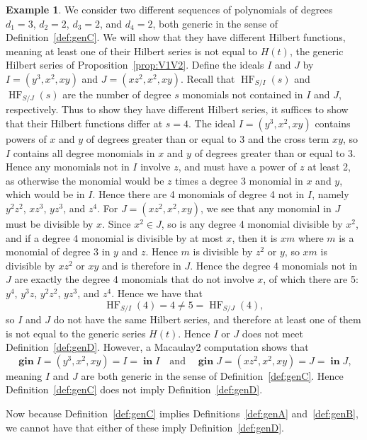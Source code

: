 \documentclass[11pt]{article}
\DeclareMathOperator{\Init}{\mathbf{in}}
\DeclareMathOperator{\HF}{HF}
\DeclareMathOperator{\gin}{\mathbf{gin}}
\theoremstyle{definition}
\newtheorem{example}{Example}
\begin{document}
\begin{example}
	We consider two different sequences of polynomials of degrees $d_1 = 3$, $d_2 = 2$, $d_3 = 2$, and $d_4 = 2$, both generic in the sense of Definition~\ref{def:genC}. We will show that they have different Hilbert functions, meaning at least one of their Hilbert series is not equal to $H(t)$, the generic Hilbert series of Proposition~\ref{prop:V1V2}. Define the ideals $I$ and $J$ by $I = (y^3, x^2, xy)$ and $J = (xz^2, x^2, xy)$. Recall that $\HF_{S/I}(s)$ and $\HF_{S/J}(s)$ are the number of degree $s$ monomials not contained in $I$ and $J$, respectively. Thus to show they have different Hilbert series, it suffices to show that their Hilbert functions differ at $s = 4$. The ideal $I = (y^3, x^2, xy)$ contains powers of $x$ and $y$ of degrees greater than or equal to 3 and the cross term $xy$, so $I$ contains all degree monomials in $x$ and $y$ of degrees greater than or equal to 3. Hence any monomials not in $I$ involve $z$, and must have a power of $z$ at least 2, as otherwise the monomial would be $z$ times a degree 3 monomial in $x$ and $y$, which would be in $I$. Hence there are 4 monomials of degree 4 not in $I$, namely $y^2 z^2$, $xz^3$, $yz^3$, and $z^4$. For $J = (xz^2, x^2, xy)$, we see that any monomial in $J$ must be divisible by $x$. Since $x^2 \in J$, so is any degree 4 monomial divisible by $x^2$, and if a degree 4 monomial is divisible by at most $x$, then it is $xm$ where $m$ is a monomial of degree 3 in $y$ and $z$. Hence $m$ is divisible by $z^2$ or $y$, so $xm$ is divisible by $xz^2$ or $xy$ and is therefore in $J$. Hence the degree 4 monomials not in $J$ are exactly the degree 4 monomials that do not involve $x$, of which there are 5: $y^4$, $y^3z$, $y^2z^2$, $yz^3$, and $z^4$. Hence we have that \[ \HF_{S/I}(4) = 4 \neq 5 = \HF_{S/J}(4), \] so $I$ and $J$ do not have the same Hilbert series, and therefore at least one of them is not equal to the generic series $H(t)$. Hence $I$ or $J$ does not meet Definition~\ref{def:genD}. However, a Macaulay2 computation shows that \[ \gin I = (y^3, x^2, xy) = I = \Init I \quad \text{and} \quad \gin J = (xz^2, x^2, xy) = J = \Init J, \] meaning $I$ and $J$ are both generic in the sense of Definition~\ref{def:genC}. Hence Definition~\ref{def:genC} does not imply Definition~\ref{def:genD}.
\end{example}


Now because Definition~\ref{def:genC} implies Definitions~\ref{def:genA} and~\ref{def:genB}, we cannot have that either of these imply Definition~\ref{def:genD}. 


\nocite{M2}
\nocite{sage}

\newpage


\end{document}
